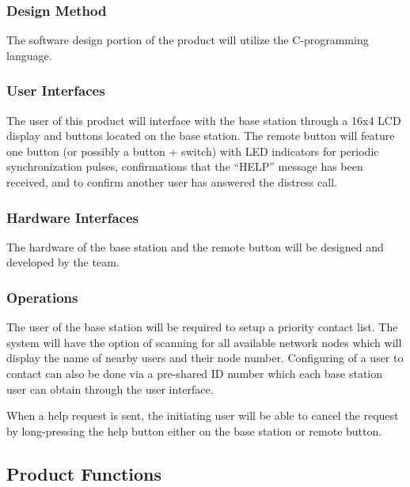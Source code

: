 \documentclass[journal]{IEEEtran}
\begin{document}
\subsubsection{Design Method}
The software design portion of the product will utilize the C-programming language.

\subsubsection{User Interfaces}
The user of this product will interface with the base station through a 16x4 LCD display and buttons located on the base station.  The remote button will feature one button (or possibly a button + switch) with LED indicators for periodic synchronization pulses, confirmations that the “HELP” message has been received, and to confirm another user has answered the distress call.

\subsubsection{Hardware Interfaces}
The hardware of the base station and the remote button will be designed and developed by the team.

\subsubsection{Operations}
The user of the base station will be required to setup a priority contact list.  The system will have the option of scanning for all available network nodes which will display the name of nearby users and their node number.  Configuring of a user to contact can also be done via a pre-shared ID number which each base station user can obtain through the user interface.

When a help request is sent, the initiating user will be able to cancel the request by long-pressing the help button either on the base station or remote button.

\subsection{Product Functions}
\end{document}
